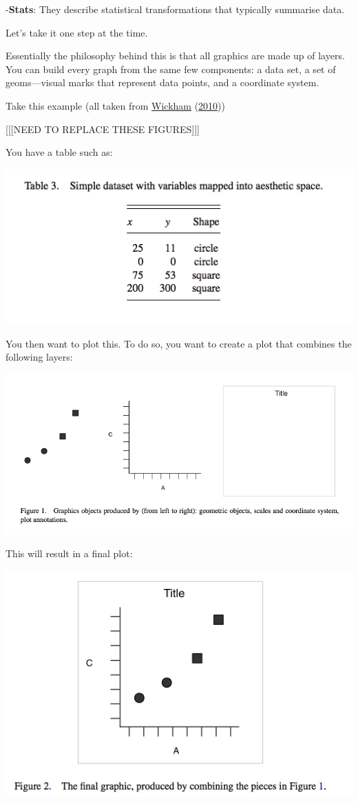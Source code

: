\documentclass[
]{book}
\begin{document}
-\textbf{Stats}: They describe statistical transformations that typically summarise data.

Let's take it one step at the time.

Essentially the philosophy behind this is that all graphics are made up of layers. You can build every graph from the same few components: a data set, a set of geoms---visual marks that represent data points, and a coordinate system.

Take this example (all taken from \protect\hyperlink{ref-Wickham_2010}{Wickham} (\protect\hyperlink{ref-Wickham_2010}{2010}))

{[}{[}{[}NEED TO REPLACE THESE FIGURES{]}{]}{]}

You have a table such as:

\includegraphics{img/table.png}

You then want to plot this. To do so, you want to create a plot that combines the following layers:

\includegraphics{img/layers.png}

This will result in a final plot:

\includegraphics{img/combined.png}
\end{document}
